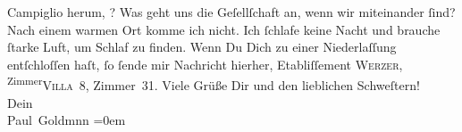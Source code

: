 \begin{ledgroupsized}[t]{13cm}
{                     Campiglio} herum, \label{K_L03075-2v}\label{K_L03075-2h}? Was geht uns die Geſellſchaft an, wenn \strikeout{\textcolor{gray}{×}} wir {\pb}miteinander ſind? Nach einem warmen Ort
               komme ich nicht. Ich ſchlafe keine Nacht und brauche ſtarke Luft, um Schlaf zu
               finden.\pend
           \pstart
           Wenn Du Dich zu einer Niederlaſſung entſchloſſen haſt, ſo ſende mir Nachricht
               hierher, Etabliſſement \textsc{Werzer}, \substVorne{}\textsuperscript{Zimmer}{\allowbreak}\substDazwischen{}\textsc{Villa}\substHinten{} 8, Zimmer 31.\pend
           \pstart
           Viele Grüße Dir und den lieblichen Schweſtern! {\\[\baselineskip]}Dein {\\[\baselineskip]}\spacefill\mbox{Paul Goldmnn}\pend
           \leftskip=0em{}
         
         \endnumbering{}\end{ledgroupsized}  \newcommand{\dateiname}{L03075}\newcommand{\titel}{Paul Goldmann an Arthur Schnitzler, 29. 7. [1901]}\newcommand{\editorInnen}{Martin Anton Müller und Laura Untner}
      